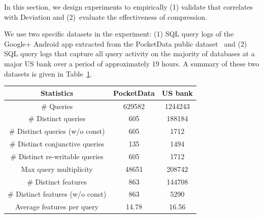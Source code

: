 In this section, we design experiments to empirically (1) validate that \errorname correlates with Deviation and (2)~evaluate the effectiveness of \systemnameone compression.

We use two specific datasets in the experiment: (1) SQL query logs of the Google+ Android app extracted from the PocketData public dataset~\cite{DBLP:conf/tpctc/KennedyACZ15} and (2) SQL query logs that capture all query activity on the majority of databases at a major US bank over a period of approximately 19 hours.
A summary of these two datasets is given in Table~\ref{table:datasummary}.

\begin{table}
\centering
{}
\label{table:datasummary}
{\small \centering
\begin{tabular}{c c c}
\toprule
Statistics & PocketData & US bank \\
\midrule
\# Queries & 629582& 1244243\\
\midrule
\# Distinct queries & 605& 188184\\
\midrule
\# Distinct queries (w/o const)& 605& 1712\\
\midrule
\# Distinct conjunctive queries & 135& 1494\\
\midrule
\# Distinct re-writable queries & 605& 1712\\
\midrule
Max query multiplicity & 48651 & 208742\\
\midrule
\# Distinct features & 863& 144708\\
\midrule
\# Distinct features (w/o const) & 863& 5290\\
\midrule
Average features per query & 14.78& 16.56\\
\bottomrule
\end{tabular}
}
\trimfigurewhitespace
\end{table}

